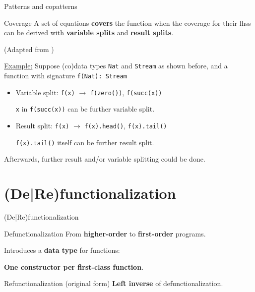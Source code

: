 \documentclass[xcolor=svgnames]{beamer}
\begin{document}
\begin{frame}
  {Patterns and copatterns}

  \begin{block}{Coverage}
    A set of equations \textbf{covers} the function when the coverage for their lhss can be derived with \textbf{variable splits} and \textbf{result splits}.

  (Adapted from \citet{abel13copatterns})

   \underline{Example:} Suppose (co)data types \texttt{Nat} and \texttt{Stream} as shown before, and a function with signature \texttt{f(Nat): Stream}
    \begin{itemize}
      \item Variable split: \texttt{f(x)} $\to$ \texttt{f(zero())}, \texttt{f(succ(x))}

      \texttt{x} in \texttt{f(succ(x))} can be further variable split.
      \item Result split: \texttt{f(x)} $\to$ \texttt{f(x).head()}, \texttt{f(x).tail()}

      \texttt{f(x).tail()} itself can be further result split.
    \end{itemize}

  Afterwards, further result and/or variable splitting could be done.
  \end{block}
\end{frame}

\section
  {(De|Re)functionalization}


\begin{frame}
  {(De|Re)functionalization}

  \begin{block}{Defunctionalization \citep{reynolds72definitional}}
    From \textbf{higher-order} to \textbf{first-order} programs.

    Introduces a \textbf{data type} for functions:

    \textbf{One constructor per first-class function}.
  \end{block}

  \begin{block}{Refunctionalization (original form) \citep{danvy09refunctionalization}}
    \textbf{Left inverse} of defunctionalization.
  \end{block}
\end{frame}
\end{document}
